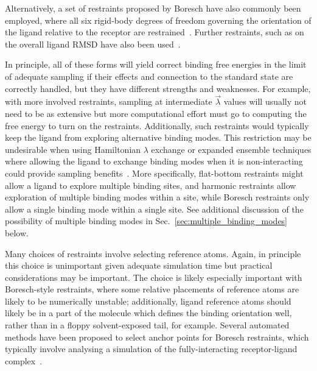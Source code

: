 \documentclass[9pt,bestpractices,pubversion]{livecoms}
\begin{document}
Alternatively, a set of restraints proposed by Boresch have also commonly been employed, where all six rigid-body degrees of freedom governing the orientation of the ligand relative to the receptor are restrained~\cite{boresch2003absolute, leitgeb2005alchemical}.
Further restraints, such as on the overall ligand RMSD have also been used~\cite{woo2005calculation}.

In principle, all of these forms will yield correct binding free energies in the limit of adequate sampling if their effects and connection to the standard state are correctly handled, but they have different strengths and weaknesses.
For example, with more involved restraints, sampling at intermediate $\vec{\lambda}$ values will usually not need to be as extensive but more computational effort must go to computing the free energy to turn on the restraints.
Additionally, such restraints would typically keep the ligand from exploring alternative binding modes. This  restriction may be undesirable when using Hamiltonian $\lambda$ exchange or expanded ensemble techniques where allowing the ligand to exchange binding modes when it is non-interacting could provide sampling benefits~\cite{wang2013identifying}.
More specifically, flat-bottom restraints might allow a ligand to explore multiple binding sites, and harmonic restraints allow exploration of multiple binding modes within a site, while Boresch restraints only allow a single binding mode within a single site.
See additional discussion of the possibility of multiple binding modes in Sec.~\ref{sec:multiple_binding_modes} below.

Many choices of restraints involve selecting reference atoms.
Again, in principle this choice is unimportant given adequate simulation time but practical considerations may be important.
The choice is likely especially important with Boresch-style restraints, where some relative placements of reference atoms are likely to be numerically unstable; additionally, ligand reference atoms should likely be in a part of the molecule which defines the binding orientation well, rather than in a floppy solvent-exposed tail, for example. Several automated methods have been proposed to select anchor points for Boresch restraints, which typically involve analysing a simulation of the fully-interacting receptor-ligand complex~\cite{alibay2022evaluating, alibay2021mdrestraintsgenerator, baumann2023broadening, chen2023enhancing, hedges2023suite}.
\end{document}
